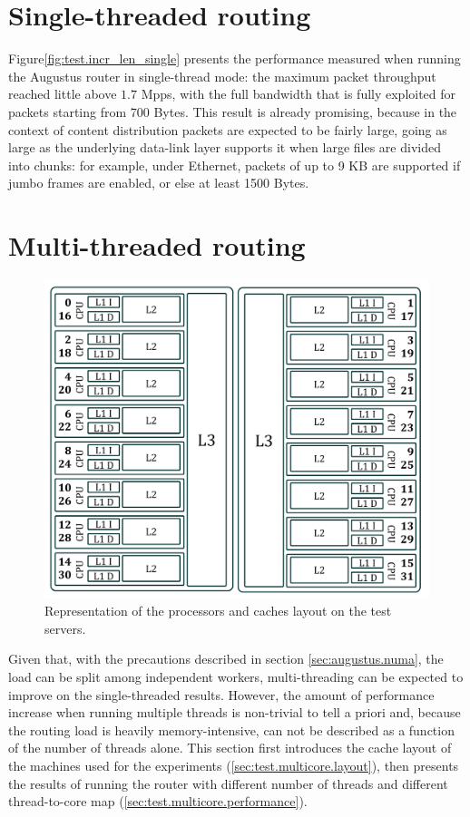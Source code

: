 \documentclass[11pt,a4paper,twoside,titlepage,openany]{book}
\begin{document}
\section{Single-threaded routing}
Figure\ref{fig:test.incr_len_single} presents the performance measured when running the Augustus router in single-thread mode: the maximum packet throughput reached little above $1.7$ \acrfull{Mpps}, with the full bandwidth that is fully exploited for packets starting from 700 Bytes. This result is already promising, because in the context of content distribution packets are expected to be fairly large, going as large as the underlying data-link layer supports it when large files are divided into chunks: for example, under Ethernet, packets of up to 9 KB are supported if jumbo frames are enabled, or else at least 1500 Bytes.

\section{Multi-threaded routing}\label{sec:test.multicore}
\begin{figure}[tb]
  \begin{center}
    \includegraphics[width=.7\textwidth]{img/cpus_horiz.pdf}
    \caption[Processors and caches layout on the test servers]{Representation of the processors and caches layout on the test servers.}
    \label{fig:test.multicore.cpus}
  \end{center}
\end{figure}

Given that, with the precautions described in section \ref{sec:augustus.numa}, the load can be split among independent workers, multi-threading can be expected to improve on the single-threaded results. However, the amount of performance increase when running multiple threads is non-trivial to tell a priori and, because the routing load is heavily memory-intensive, can not be described as a function of the number of threads alone. This section first introduces the cache layout of the machines used for the experiments (\ref{sec:test.multicore.layout}), then presents the results of running the router with different number of threads and different thread-to-core map (\ref{sec:test.multicore.performance}).
\end{document}
